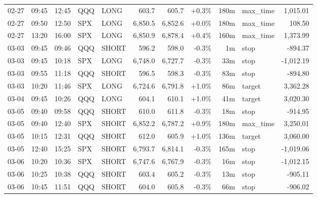 \documentclass[11pt,a4paper,twoside]{article}
\begin{document}
\begin{center}
\begin{longtable}{>{\color{txtmain}}l l l l l r r r r >{\color{txtmain}}l r}
02-27 & 09:45 & 12:45 & QQQ & LONG & 603.7 & 605.7 & \textcolor{wingreen}{+0.3\%} & 180m & max\_time & \textcolor{wingreen}{1,015.01} \\
02-27 & 09:50 & 12:50 & SPX & LONG & 6,850.5 & 6,852.6 & \textcolor{wingreen}{+0.0\%} & 180m & max\_time & \textcolor{wingreen}{108.50} \\
02-27 & 13:20 & 16:00 & SPX & LONG & 6,850.9 & 6,878.4 & \textcolor{wingreen}{+0.4\%} & 160m & max\_time & \textcolor{wingreen}{1,373.99} \\
03-03 & 09:45 & 09:46 & QQQ & SHORT & 596.2 & 598.0 & \textcolor{lossred}{-0.3\%} & 1m & stop & \textcolor{lossred}{-894.37} \\
03-03 & 09:45 & 10:18 & SPX & LONG & 6,748.0 & 6,727.7 & \textcolor{lossred}{-0.3\%} & 33m & stop & \textcolor{lossred}{-1,012.19} \\
03-03 & 09:55 & 11:18 & QQQ & SHORT & 596.5 & 598.3 & \textcolor{lossred}{-0.3\%} & 83m & stop & \textcolor{lossred}{-894.80} \\
03-03 & 10:20 & 11:46 & SPX & LONG & 6,724.6 & 6,791.8 & \textcolor{wingreen}{+1.0\%} & 86m & target & \textcolor{wingreen}{3,362.28} \\
03-04 & 09:45 & 10:26 & QQQ & LONG & 604.1 & 610.1 & \textcolor{wingreen}{+1.0\%} & 41m & target & \textcolor{wingreen}{3,020.30} \\
03-05 & 09:40 & 09:58 & QQQ & SHORT & 610.0 & 611.8 & \textcolor{lossred}{-0.3\%} & 18m & stop & \textcolor{lossred}{-914.95} \\
03-05 & 09:40 & 12:40 & SPX & SHORT & 6,852.2 & 6,787.2 & \textcolor{wingreen}{+0.9\%} & 180m & max\_time & \textcolor{wingreen}{3,250.01} \\
03-05 & 10:15 & 12:31 & QQQ & SHORT & 612.0 & 605.9 & \textcolor{wingreen}{+1.0\%} & 136m & target & \textcolor{wingreen}{3,060.00} \\
03-05 & 12:40 & 15:25 & SPX & SHORT & 6,793.7 & 6,814.1 & \textcolor{lossred}{-0.3\%} & 165m & stop & \textcolor{lossred}{-1,019.06} \\
03-06 & 10:20 & 10:36 & SPX & SHORT & 6,747.6 & 6,767.9 & \textcolor{lossred}{-0.3\%} & 16m & stop & \textcolor{lossred}{-1,012.15} \\
03-06 & 10:25 & 10:38 & QQQ & SHORT & 603.4 & 605.2 & \textcolor{lossred}{-0.3\%} & 13m & stop & \textcolor{lossred}{-905.11} \\
03-06 & 10:45 & 11:51 & QQQ & SHORT & 604.0 & 605.8 & \textcolor{lossred}{-0.3\%} & 66m & stop & \textcolor{lossred}{-906.02} \\

\end{longtable}
\end{center}
\end{document}

